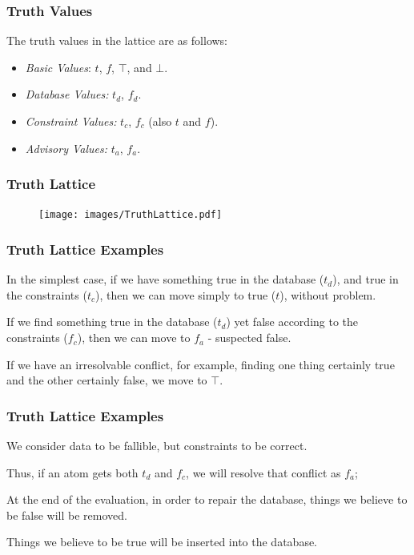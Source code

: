 \begin{frame}
\frametitle{Truth Values}

The truth values in the lattice are as follows:

\begin{itemize}
\item \textit{Basic Values}: $t$, $f$, $\top$, and $\bot$.
\item \textit{Database Values:} $t_d$, $f_d$.
\item \textit{Constraint Values:} $t_c$, $f_c$ (also $t$ and $f$).
\item \textit{Advisory Values:} $t_a$, $f_a$.
\end{itemize}



\end{frame}

\begin{frame}
\frametitle{Truth Lattice}

\begin{figure}[!h]
  \centering \texttt{[image: images/TruthLattice.pdf]}
\end{figure}


\end{frame}

\begin{frame}
\frametitle{Truth Lattice Examples}

In the simplest case, if we have something true in the database ($t_d$), and true in the constraints ($t_c$), then we can move simply to true ($t$), without problem. 

If we find something true in the database ($t_d$) yet false according to the constraints ($f_c$), then we can move to $f_a$ - suspected false. 

If we have an irresolvable conflict, for example, finding one thing certainly true and the other certainly false, we move to $\top$.

\end{frame}

\begin{frame}
\frametitle{Truth Lattice Examples}

We consider data to be fallible, but constraints to be correct.

Thus, if an atom gets both $t_d$ and $f_c$, we will resolve that conflict as $f_a$; 
 
 At the end of the evaluation, in order to repair the database, things we believe to 
be false will be removed.

Things we believe to be true will be inserted into the database.

\end{frame}

